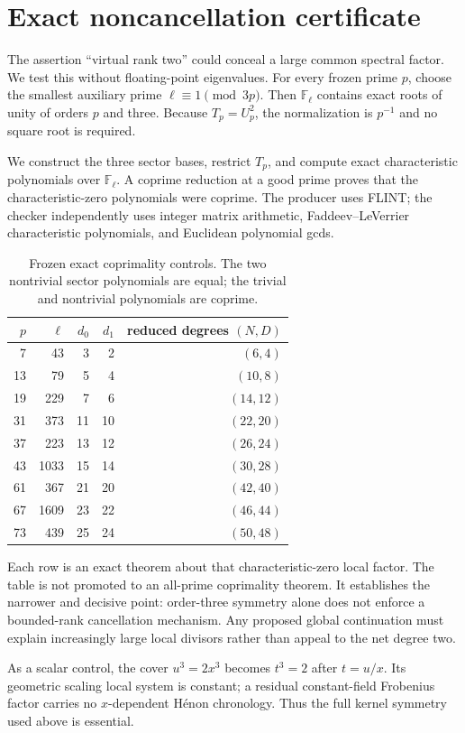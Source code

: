 \section{Exact noncancellation certificate}

The assertion ``virtual rank two'' could conceal a large common spectral
factor.  We test this without floating-point eigenvalues.  For every frozen
prime $p$, choose the smallest auxiliary prime
$\ell\equiv1\pmod{3p}$.  Then $\mathbb F_\ell$ contains exact roots of unity
of orders $p$ and three.  Because $T_p=U_p^2$, the normalization is $p^{-1}$
and no square root is required.

We construct the three sector bases, restrict $T_p$, and compute exact
characteristic polynomials over $\mathbb F_\ell$.  A coprime reduction at a
good prime proves that the characteristic-zero polynomials were coprime.
The producer uses FLINT; the checker independently uses integer matrix
arithmetic, Faddeev--LeVerrier characteristic polynomials, and Euclidean
polynomial gcds.

\begin{table}[ht]
\centering
\caption{Frozen exact coprimality controls.  The two nontrivial sector
polynomials are equal; the trivial and nontrivial polynomials are coprime.}
\label{tab:controls}
\begin{tabular}{rrrrr}
\toprule
$p$ & $\ell$ & $d_0$ & $d_1$ & reduced degrees $(N,D)$\\
\midrule
7  & 43   & 3  & 2  & $(6,4)$\\
13 & 79   & 5  & 4  & $(10,8)$\\
19 & 229  & 7  & 6  & $(14,12)$\\
31 & 373  & 11 & 10 & $(22,20)$\\
37 & 223  & 13 & 12 & $(26,24)$\\
43 & 1033 & 15 & 14 & $(30,28)$\\
61 & 367  & 21 & 20 & $(42,40)$\\
67 & 1609 & 23 & 22 & $(46,44)$\\
73 & 439  & 25 & 24 & $(50,48)$\\
\bottomrule
\end{tabular}
\end{table}

Each row is an exact theorem about that characteristic-zero local factor.
The table is not promoted to an all-prime coprimality theorem.  It establishes
the narrower and decisive point: order-three symmetry alone does not enforce
a bounded-rank cancellation mechanism.  Any proposed global continuation
must explain increasingly large local divisors rather than appeal to the net
degree two.

As a scalar control, the cover $u^3=2x^3$ becomes $t^3=2$ after $t=u/x$.
Its geometric scaling local system is constant; a residual constant-field
Frobenius factor carries no $x$-dependent H\'enon chronology.  Thus the full
kernel symmetry used above is essential.

